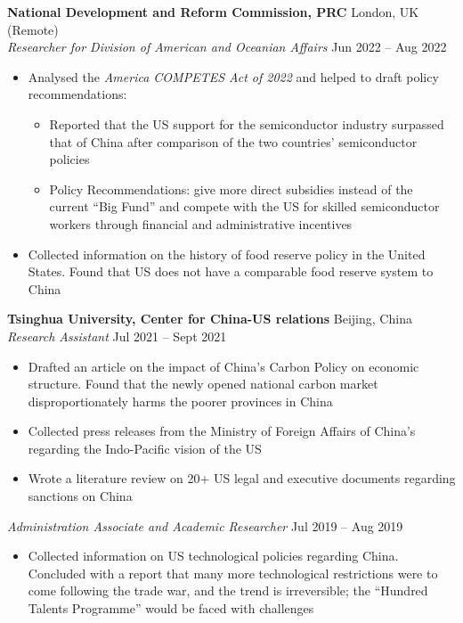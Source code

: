 \documentclass[a4paper,9pt]{extarticle}
\begin{document}
\noindent
\textbf{National Development and Reform Commission, PRC } \hfill London, UK (Remote) \\
\textit{Researcher for Division of American and Oceanian Affairs} \hfill Jun 2022 – Aug 2022 %
\begin{itemize}
    \item Analysed the \textit{America COMPETES Act of 2022} and helped to draft policy recommendations:
    \begin{itemize}
        \item Reported that the US support for the semiconductor industry surpassed that of China after comparison of the two countries’ semiconductor policies
        \item Policy Recommendations: give more direct subsidies instead of the current “Big Fund” and compete with the US for skilled semiconductor workers through financial and administrative incentives
    \end{itemize}
    \item Collected information on the history of food reserve policy in the United States. Found that US does not have a comparable food reserve system to China
\end{itemize}
\noindent
\textbf{Tsinghua University, Center for China-US relations} \hfill Beijing, China\\
\textit{Research Assistant} \hfill Jul 2021 – Sept 2021
\begin{itemize}
    \item Drafted an article on the impact of China’s Carbon Policy on economic structure. Found that the newly opened national carbon market disproportionately harms the poorer provinces in China
    \item Collected press releases from the Ministry of Foreign Affairs of China’s regarding the Indo-Pacific vision of the US
    \item Wrote a literature review on 20+ US legal and executive documents regarding sanctions on China
\end{itemize}
\textit{Administration Associate and Academic Researcher} \hfill Jul 2019 – Aug 2019
\begin{itemize}
    \item Collected information on US technological policies regarding China. Concluded with a report that many more technological restrictions were to come following the trade war, and the trend is irreversible; the “Hundred Talents Programme” would be faced with challenges
\end{itemize}
\end{document}
